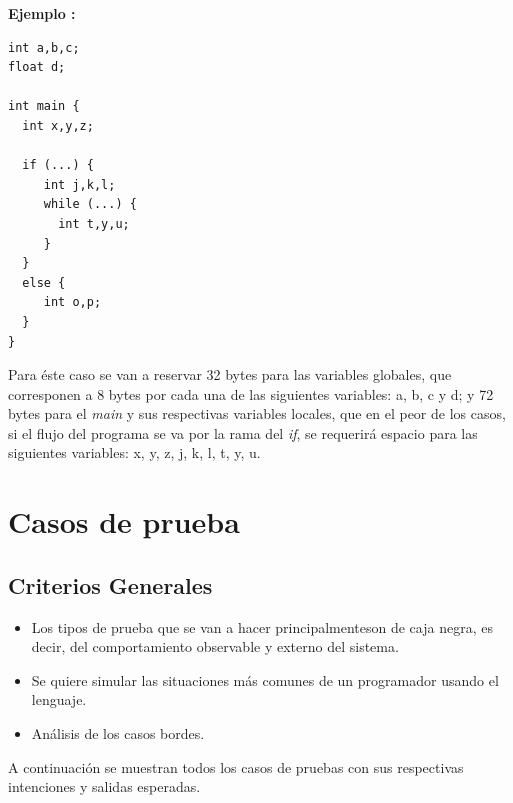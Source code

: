 \documentclass[11pt, spanish]{report}
\begin{document}
\textbf{Ejemplo :}\\

\begin{verbatim}
int a,b,c;
float d;

int main {
  int x,y,z;

  if (...) {
     int j,k,l;
     while (...) {
       int t,y,u;
     }
  }
  else {
     int o,p;
  }
}
\end{verbatim}

Para \'este caso se van a reservar 32 bytes para las variables globales, que corresponen a 8 bytes por cada una de las siguientes variables: a, b, c y d; y 72 bytes para el \emph{main}
y sus respectivas variables locales, que en el peor de los casos, si el flujo del programa se va por la rama del \emph{if}, se requerir\'a espacio para las siguientes variables: x, y, 
z, j, k, l, t, y, u.\\

\section{Casos de prueba}

\subsection{Criterios Generales}

\begin{itemize}
\item Los tipos de prueba que se van a hacer principalmenteson de caja negra, es decir, del comportamiento observable y externo del sistema.
\item Se quiere simular las situaciones m\'as comunes de un programador usando el lenguaje.
\item An\'alisis de los casos bordes.
\end{itemize}

A continuaci\'on se muestran todos los casos de pruebas con sus respectivas intenciones y salidas esperadas.\\
\end{document}
